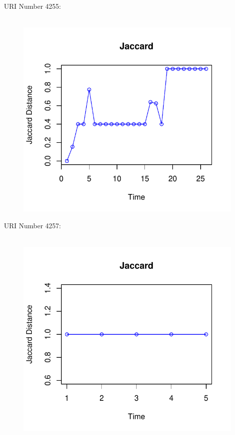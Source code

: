 \documentclass[12pt]{article}
\begin{document}
URI Number 4255:\\
\begin{figure}[H]
    \centering
    \includegraphics[scale=0.7]{4255.pdf}
\end{figure}

URI Number 4257:\\
\begin{figure}[H]
    \centering
    \includegraphics[scale=0.7]{4257.pdf}
\end{figure}
\end{document}
